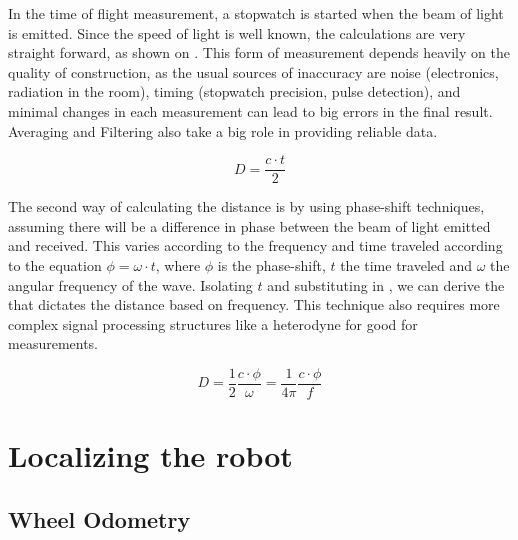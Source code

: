 In the time of flight measurement, a stopwatch is started when the beam of light is emitted. Since the speed of light is well known, the calculations are very straight forward, as shown on . This form of measurement depends heavily on the quality of construction, as the usual sources of inaccuracy are noise (electronics, radiation in the room), timing (stopwatch precision, pulse detection), and minimal changes in each measurement can lead to big errors in the final result. Averaging and Filtering also take a big role in providing reliable data.

\begin{equation} \label{eq:d}
D = \frac{c \cdot t}{2}
\end{equation}

The second way of calculating the distance is by using phase-shift techniques, assuming there will be a difference in phase between the beam of light emitted and received. This varies according to the frequency and time traveled according to the equation $\phi = \omega \cdot t$, where $\phi$ is the phase-shift, $t$ the time traveled and $\omega$ the angular frequency of the wave. Isolating $t$ and substituting in , we can derive the  that dictates the distance based on frequency. This technique also requires more complex signal processing structures like a heterodyne for good for measurements.

\begin{equation} \label{eq:d2}
D = \frac{1}{2} \frac{c \cdot \phi}{\omega} = \frac{1}{4 \pi} \frac{c \cdot \phi}{f}
\end{equation}



\section{Localizing the robot}

\subsection{Wheel Odometry}

